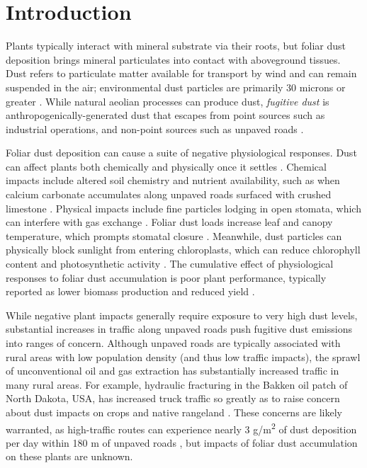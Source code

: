 \documentclass{svjour3}
\begin{document}
\section{Introduction}

Plants typically interact with mineral substrate via their roots, but foliar dust deposition brings mineral particulates into contact with aboveground tissues. 
Dust refers to particulate matter available for transport by wind and can remain suspended in the air; environmental dust particles are primarily 30 microns or greater \citep{fairweather1965}. 
While natural aeolian processes can produce dust, \emph{fugitive dust} is anthropogenically-generated dust that escapes from point sources such as industrial operations, and non-point sources such as unpaved roads \citep{ulrichs2008}.

Foliar dust deposition can cause a suite of negative physiological responses.   
Dust can affect plants both chemically and physically once it settles \citep{farmer1993,ulrichs2008}.
Chemical impacts include altered soil chemistry and nutrient availability, such as when calcium carbonate accumulates along unpaved roads surfaced with crushed limestone \citep{organiscak2004}. 
Physical impacts include fine particles lodging in open stomata, which can interfere with gas exchange \citep{sharifi1997}.  
Foliar dust loads increase leaf and canopy temperature, which prompts stomatal closure \citep{eller1977, zia-khan2014}. 
Meanwhile, dust particles can physically block sunlight from entering chloroplasts, which can reduce chlorophyll content and photosynthetic activity \citep{thompson1984,fischer1998, chaurasia2013, bao2015,sarma2017}. 
The cumulative effect of physiological responses to foliar dust accumulation is poor plant performance, typically reported as lower biomass production and reduced yield \citep{fischer1998, zia-khan2014,sarma2017}. 

While negative plant impacts generally require exposure to very high dust levels, substantial increases in traffic along unpaved roads push fugitive dust emissions into ranges of concern. 
Although unpaved roads are typically associated with rural areas with low population density (and thus low traffic impacts), the sprawl of unconventional oil and gas extraction has substantially increased traffic in many rural areas. 
For example, hydraulic fracturing in the Bakken oil patch of North Dakota, USA, has increased truck traffic so greatly as to raise concern about dust impacts on crops and native rangeland \citep{mcgranahan2017}. 
These concerns are likely warranted, as high-traffic routes can experience nearly 3 g/m\textsuperscript{2} of dust deposition per day within 180 m of unpaved roads \citep{spiess2020}, but impacts of foliar dust accumulation on these plants are unknown. 
\end{document}
